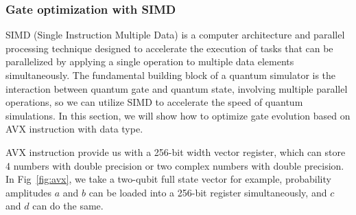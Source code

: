 \subsubsection{Gate optimization with SIMD}
SIMD (Single Instruction Multiple Data) is a computer architecture and parallel processing technique designed to accelerate the execution of tasks that can be parallelized by applying a single operation to multiple data elements simultaneously. The fundamental building block of a quantum simulator is the interaction between quantum gate and quantum state, involving multiple parallel operations, so we can utilize SIMD to accelerate the speed of quantum simulations. In this section, we will show how to optimize gate evolution based on AVX instruction with  data type.

AVX instruction provide us with a 256-bit width vector register, which can store 4 numbers with double precision or two complex numbers with double precision. In Fig~\ref{fig:avx}, we take a two-qubit full state vector for example, probability amplitudes $a$ and $b$ can be loaded into a 256-bit register simultaneously, and $c$ and $d$ can do the same.
